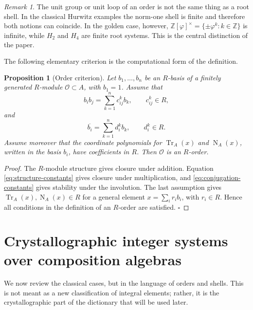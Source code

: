 \documentclass[12pt,oneside,english]{amsart}
\numberwithin{equation}{section}
\numberwithin{figure}{section}
\numberwithin{table}{section}
\theoremstyle{plain}
\newtheorem{proposition}[theorem]{Proposition}
\theoremstyle{definition}
\theoremstyle{remark}
\newtheorem{remark}[theorem]{Remark}
\newcommand{\ZZ}{\mathbb Z}
\newcommand{\Zphi}{\mathbb Z[\varphi]}
\newcommand{\Tr}{\operatorname{Tr}}
\newcommand{\Norm}{\operatorname{N}}
\begin{document}
\begin{remark}
The unit group or unit loop of an order is not the same thing as a root shell. In the classical Hurwitz examples the norm-one shell is finite and therefore both notions can coincide. In the golden case, however, \(\Zphi^\times=\{\pm\varphi^k:k\in\ZZ\}\) is infinite, while \(H_2\) and \(H_4\) are finite root systems. This is the central distinction of the paper.
\end{remark}

The following elementary criterion is the computational form of the definition.

\begin{proposition}[Order criterion]
Let \(b_1,\ldots,b_n\) be an \(R\)-basis of a finitely generated \(R\)-module \(\mathcal O\subset A\), with \(b_1=1\). Assume that
\begin{equation}
b_i b_j=\sum_{k=1}^n c_{ij}^k b_k,\qquad c_{ij}^k\in R,
\label{eq:structure-constants}
\end{equation}
and
\begin{equation}
\overline{b_i}=\sum_{k=1}^n d_i^k b_k,\qquad d_i^k\in R.
\label{eq:conjugation-constants}
\end{equation}
Assume moreover that the coordinate polynomials for \(\Tr_A(x)\) and \(\Norm_A(x)\), written in the basis \(b_i\), have coefficients in \(R\). Then \(\mathcal O\) is an \(R\)-order.
\end{proposition}

\begin{proof}
The \(R\)-module structure gives closure under addition. Equation \eqref{eq:structure-constants} gives closure under multiplication, and \eqref{eq:conjugation-constants} gives stability under the involution. The last assumption gives \(\Tr_A(x),\Norm_A(x)\in R\) for a general element \(x=\sum_i r_i b_i\), with \(r_i\in R\). Hence all conditions in the definition of an \(R\)-order are satisfied. \(\square\)
\end{proof}

\section{Crystallographic integer systems over composition algebras}

We now review the classical cases, but in the language of orders and shells. This is not meant as a new classification of integral elements; rather, it is the crystallographic part of the dictionary that will be used later.
\end{document}
